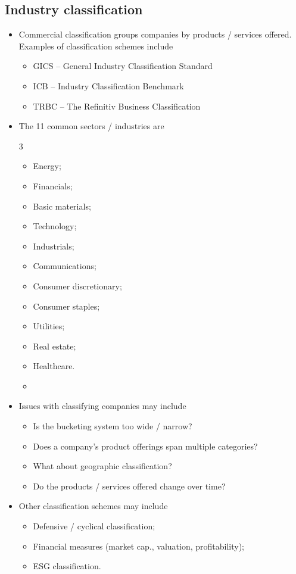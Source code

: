 \documentclass[../notes_compiled.tex]{subfiles}
\begin{document}
\subsection{Industry classification}
\begin{itemize}
\item Commercial classification groups companies by products / services offered. Examples of classification schemes include
\begin{itemize}
\item GICS -- General Industry Classification Standard
\item ICB -- Industry Classification Benchmark
\item TRBC -- The Refinitiv Business Classification
\end{itemize}
\item The 11 common sectors / industries are
\begin{multicols}{3}
\begin{itemize}
\item Energy;
\item Financials;
\item Basic materials;
\item Technology;
\item Industrials;
\item Communications;
\item Consumer discretionary;
\item Consumer staples;
\item Utilities;
\item Real estate;
\item Healthcare.
\item[]
\end{itemize}
\end{multicols}
\item Issues with classifying companies may include
\begin{itemize}
\item Is the bucketing system too wide / narrow?
\item Does a company’s product offerings span multiple categories?
\item What about geographic classification?
\item Do the products / services offered change over time?
\end{itemize}
\item Other classification schemes may include
\begin{itemize}
\item Defensive / cyclical classification;
\item Financial measures (market cap., valuation, profitability);
\item ESG classification.
\end{itemize}
\end{itemize}
\end{document}
